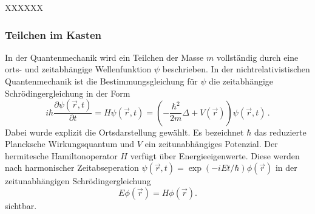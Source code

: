 XXXXXX

\subsubsection{Teilchen im Kasten}
\label{subsubsec:kasten}
In der Quantenmechanik wird ein Teilchen der Masse $m$ vollständig durch eine orts- und zeitabhängige Wellenfunktion $\psi$ beschrieben. In der nichtrelativistischen Quantenmechanik ist die Bestimmungsgleichung für $\psi$ die zeitabhängige Schrödingergleichung in der Form
\begin{equation}
  i \hbar \frac{\partial \psi(\vec{r},t)}{\partial t} = H \psi(\vec{r},t) = \left(- \frac{\hbar^2}{2 m} \Delta + V(\vec{r})\right) \psi(\vec{r},t)\,.
  \label{eqn:schroedingerZeitabhaengig}
\end{equation}
Dabei wurde explizit die Ortsdarstellung gewählt. Es bezeichnet $\hbar$ das reduzierte Plancksche Wirkungsquantum und $V$ ein zeitunabhängiges Potenzial. Der hermitesche Hamiltonoperator $H$ verfügt über Energieeigenwerte. Diese werden nach harmonischer Zeitabseperation $\psi(\vec{r},t) = \exp(-i E t / \hbar) \phi(\vec{r})$ in der zeitunabhängigen Schrödingergleichung
\begin{equation}
  E \phi(\vec{r}) = H \phi(\vec{r}).
  \label{eqn:schroedingerZeitunabhaengig}
\end{equation}
sichtbar.
